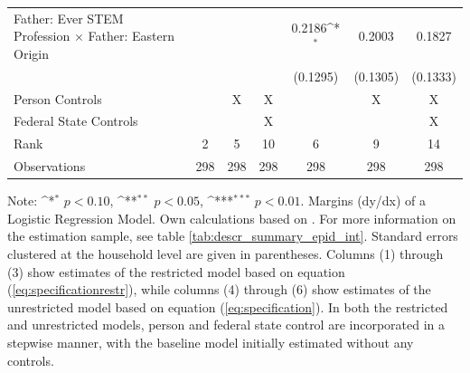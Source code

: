 \documentclass[a4paper, oneside, hyperfootnotes = false]{article}
\def\sym#1{\ifmmode^{#1}\else\(^{#1}\)\fi}
\begin{document}
{\begin{landscape}
\begin{table}[ht]
\begin{center}
{\begin{tabular}{l*{6}{c}}
					\addlinespace
					Father: Ever STEM Profession $\times$ Father: Eastern Origin&                     &                     &                     &      0.2186\sym{*}  &      0.2003         &      0.1827         \\
					&                     &                     &                     &    (0.1295)         &    (0.1305)         &    (0.1333)         \\
					\midrule
					Person Controls & & X  & X & & X & X \\
					Federal State Controls & & & X & & & X \\
					Rank                &      2         &      5         &     10         &      6         &      9         &     14         \\
					Observations                   &    298         &    298         &    298         &    298         &    298         &    298         \\
					\bottomrule
			\end{tabular}}
			
			\vspace{2mm}
			
			\parbox{15cm}{
				\linespread{1}\footnotesize Note: \sym{*} \(p<0.10\), \sym{**} \(p<0.05\), \sym{***} \(p<0.01\). Margins (dy/dx) of a Logistic Regression Model. Own calculations based on \cite{SOEP2023}. For more information on the estimation sample, see table \ref{tab:descr_summary_epid_int}. Standard errors clustered at the household level are given in parentheses. Columns (1) through (3) show estimates of the restricted model based on equation (\ref{eq:specificationrestr}), while columns (4) through (6) show estimates of the unrestricted model based on equation (\ref{eq:specification}). In both the restricted and unrestricted models, person and federal state control are incorporated in a stepwise manner, with the baseline model initially estimated without any controls.}
			
		\end{center}
	\end{table}
\end{landscape}

}
\end{document}

